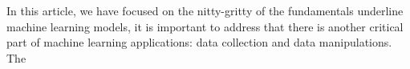 In this article, we have focused on the nitty-gritty of the fundamentals underline machine learning models, it is important to address that there is another critical part of machine learning applications: data collection and data manipulations. The  